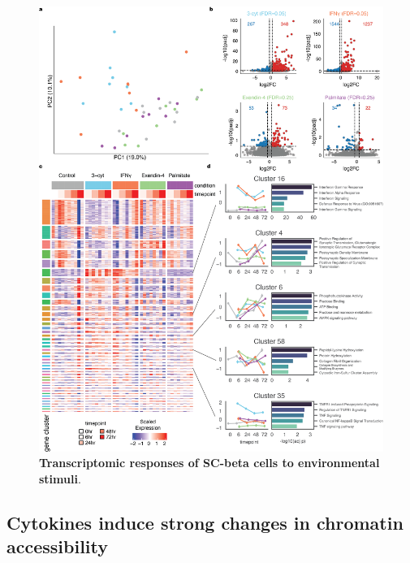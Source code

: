 \clearpage

\begin{figure}[!htbp]
    \centering
    \includegraphics[height=0.8\textheight, keepaspectratio]{3_figures-and-files/Fig2.png}
    \caption[Transcriptomic responses of SC-beta cells to environmental stimuli]{\textbf{Transcriptomic responses of SC-beta cells to environmental stimuli}.}
    \label{fig:3 Figure 2}
\end{figure}

\clearpage


\subsection{Cytokines induce strong changes in chromatin accessibility}

